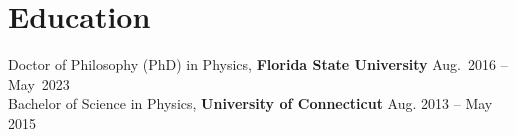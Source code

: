 \documentclass[letterpaper,11pt]{article}
\makeatletter
\newcommand{\resumeSubheading}[4]{
  \vspace{-2pt}\item
    \begin{tabular*}{0.97\textwidth}[t]{l@{\extracolsep{\fill}}r}
      \textbf{#1} & #2 \\
      \textit{\small#3} & \textit{\small #4} \\
    \end{tabular*}\vspace{-7pt}
}
\newcommand{\resumeSubHeadingListStart}{\begin{itemize}[leftmargin=0.15in, label={}]}
\newcommand{\resumeSubHeadingListEnd}{\end{itemize}}
\makeatother
\begin{document}
\section{Education}


\hspace{0.2cm} \small{Doctor of Philosophy (PhD) in Physics, \textbf{Florida State University} \hfill{Aug.~2016 -- May~2023}} \\
\hspace{0.2cm} \small{Bachelor of Science in Physics, \textbf{University of Connecticut }\hfill{Aug. 2013 -- May 2015}}

\end{document}
